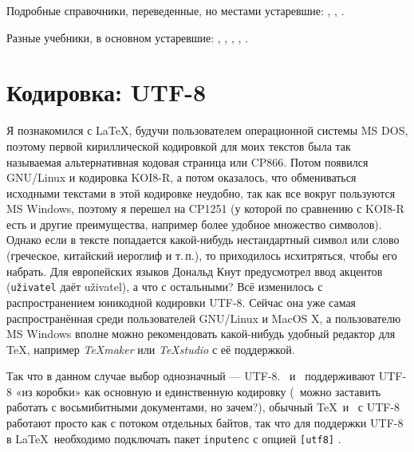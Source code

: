 \documentclass[a4paper,12pt,hyphens]{article}
\newcommand\softname[1]{\textit{#1}}
\newcommand\package[1]{\texttt{#1}}
\newcommand\lcmd[1]{\texttt{#1}}
\begin{document}
Подробные справочники, переведенные, но местами устаревшие:
\parencite{gussens-mittelbach-samarin:1999},
\parencite{gussens-ratz-mittelbach:2002},
\parencite{gussens-ratz:2001}.

Разные учебники, в основном устаревшие:
\parencite{rozhenko:2005},
\parencite{baldin:2008},
\parencite{kotelnikov-chebotaev:2016},
\parencite{belyakov-palosh-sadovskiy:2012},
\parencite{morozov-parhomenko:2011}.

\section{Кодировка: UTF-8}
Я познакомился с \LaTeX, будучи пользователем операционной системы MS DOS,
поэтому первой кириллической кодировкой для моих текстов была так называемая
альтернативная кодовая страница или CP866. Потом появился GNU/Linux и кодировка
KOI8-R, а потом оказалось, что обмениваться исходными текстами в этой кодировке
неудобно, так как все вокруг пользуются MS Windows, поэтому я перешел на
CP1251 (у которой по сравнению с KOI8-R есть и другие преимущества, например
более удобное множество символов). Однако если в тексте попадается какой-нибудь
нестандартный символ или слово (греческое, китайский иероглиф и т.\,п.), то
приходилось исхитряться, чтобы его набрать. Для европейских языков Дональд Кнут
предусмотрел ввод акцентов (\lcmd{u\v{z}ivatel} даёт u\v{z}ivatel), а что с
остальными? Всё изменилось с распространением юникодной кодировки UTF-8. Сейчас
она уже самая распространённая среди пользователей GNU/Linux и MacOS X,
а пользователю MS Windows вполне можно рекомендовать какой-нибудь удобный
редактор для \TeX, например \softname{TeXmaker} \parencite{site-texmaker}
или \softname{TeXstudio} \parencite{site-texstudio} с её поддержкой.

Так что в данном случае выбор однозначный --- UTF-8. \LuaTeX\ и \XeTeX\ поддерживают
UTF-8 «из коробки» как основную и единственную кодировку (\LuaLaTeX\ можно
заставить работать с восьмибитными документами, но зачем?), обычный \TeX\
и \pdfTeX\ с UTF-8 работают просто как с потоком отдельных байтов, так что
для поддержки UTF-8 в \LaTeX\ необходимо подключать пакет \package{inputenc}
с опцией \lcmd{[utf8]} \parencite{ctan-inputenc}.
\end{document}
